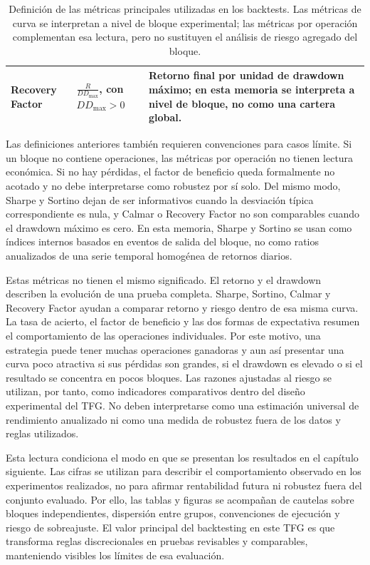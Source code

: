 \begin{table}[H]
\begin{tabular}{p{} p{} p{}}
Recovery Factor & \(\frac{R}{DD_\text{max}}\), con \(DD_\text{max}>0\) & Retorno final por unidad de drawdown m\'aximo; en esta memoria se interpreta a nivel de bloque, no como una cartera global. \\
\hline
\end{tabular}
\caption[Definici\'on de m\'etricas de backtesting]{Definici\'on de las m\'etricas principales utilizadas en los backtests.
Las m\'etricas de curva se interpretan a nivel de bloque experimental; las
m\'etricas por operaci\'on complementan esa lectura, pero no sustituyen el
an\'alisis de riesgo agregado del bloque.}
\label{tab:definicion-metricas-backtesting}
\end{table}

Las definiciones anteriores tambi\'en requieren convenciones para casos l\'imite.
Si un bloque no contiene operaciones, las m\'etricas por operaci\'on no tienen
lectura econ\'omica. Si no hay p\'erdidas, el factor de beneficio queda
formalmente no acotado y no debe interpretarse como robustez por s\'i solo. Del
mismo modo, Sharpe y Sortino dejan de ser informativos cuando la desviaci\'on
t\'ipica correspondiente es nula, y Calmar o Recovery Factor no son comparables
cuando el drawdown m\'aximo es cero. En esta memoria, Sharpe y Sortino se usan
como \'indices internos basados en eventos de salida del bloque, no como ratios
anualizados de una serie temporal homog\'enea de retornos diarios.

Estas m\'etricas no tienen el mismo significado. El retorno y el drawdown
describen la evoluci\'on de una prueba completa. Sharpe, Sortino, Calmar y
Recovery Factor ayudan a comparar retorno y riesgo dentro de esa misma curva.
La tasa de acierto, el factor de beneficio y las dos formas de expectativa
resumen el comportamiento de las operaciones individuales.
Por este motivo, una estrategia puede tener muchas operaciones ganadoras y aun
as\'i presentar una curva poco atractiva si sus p\'erdidas son grandes, si el
drawdown es elevado o si el resultado se concentra en pocos bloques.
Las razones ajustadas al riesgo se utilizan, por tanto, como indicadores
comparativos dentro del dise\~no experimental del TFG. No deben interpretarse
como una estimaci\'on universal de rendimiento anualizado ni como una medida de
robustez fuera de los datos y reglas utilizados.

Esta lectura condiciona el modo en que se presentan los resultados en el
cap\'itulo siguiente. Las cifras se utilizan para describir el comportamiento
observado en los experimentos realizados, no para afirmar rentabilidad futura
ni robustez fuera del conjunto evaluado. Por ello, las tablas y figuras se
acompa\~nan de cautelas sobre bloques independientes, dispersi\'on entre grupos,
convenciones de ejecuci\'on y riesgo de sobreajuste. El valor principal del
backtesting en este TFG es que transforma reglas discrecionales en pruebas
revisables y comparables, manteniendo visibles los l\'imites de esa evaluaci\'on.

